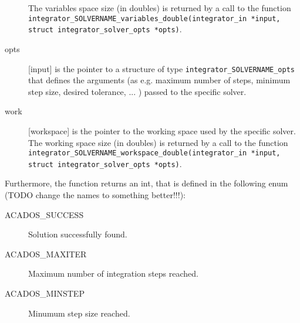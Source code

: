 \documentclass{report}
\begin{document}
\begin{description}
The variables space size (in doubles) is returned by a call to the function \\{\tt integrator\_SOLVERNAME\_variables\_double(integrator\_in *input, struct integrator\_solver\_opts *opts)}. 
\item[opts] [input] is the pointer to a structure of type {\tt integrator\_SOLVERNAME\_opts} that defines the arguments (as e.g. maximum number of steps, minimum step size, desired tolerance, ... ) passed to the specific solver.
\item[work] [workspace] is the pointer to the working space used by the specific solver.
The working space size (in doubles) is returned by a call to the function {\tt integrator\_SOLVERNAME\_workspace\_double(integrator\_in *input, struct integrator\_solver\_opts *opts)}. 
\end{description}

Furthermore, the function returns an int, that is defined in the following enum (TODO change the names to something better!!!):
\begin{description}
\item[ACADOS\_SUCCESS] Solution successfully found.
\item[ACADOS\_MAXITER] Maximum number of integration steps reached.
\item[ACADOS\_MINSTEP] Minumum step size reached.
\end{description}
\end{document}
